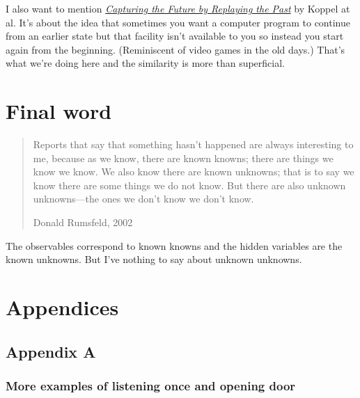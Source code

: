 \documentclass[12pt]{article}
\begin{document}
I also want to mention \href{https://arxiv.org/abs/1710.10385}{{\em Capturing the Future by Replaying the Past}}
by Koppel at al.
It's about the idea that sometimes you want a computer program to continue
from an earlier state but that facility isn't available to you so instead
you start again from the beginning.
(Reminiscent of video games in the old days.)
That's what we're doing here and the similarity is more than superficial.

\hypertarget{final-word}{%
\section{Final word}\label{final-word}}

\begin{quote}
Reports that say that something hasn't happened are always interesting
to me, because as we know, there are known knowns; there are things we
know we know. We also know there are known unknowns; that is to say we
know there are some things we do not know. But there are also unknown
unknowns---the ones we don't know we don't know.

Donald Rumsfeld, 2002
\end{quote}

The observables correspond to known knowns and the hidden variables are the known
unknowns. But I've nothing to say about unknown unknowns.

\section{Appendices}

\hypertarget{appendix-a}{%
\subsection*{Appendix A}\label{appendix-a}}

\subsubsection*{More examples of listening once and opening door}
\end{document}
